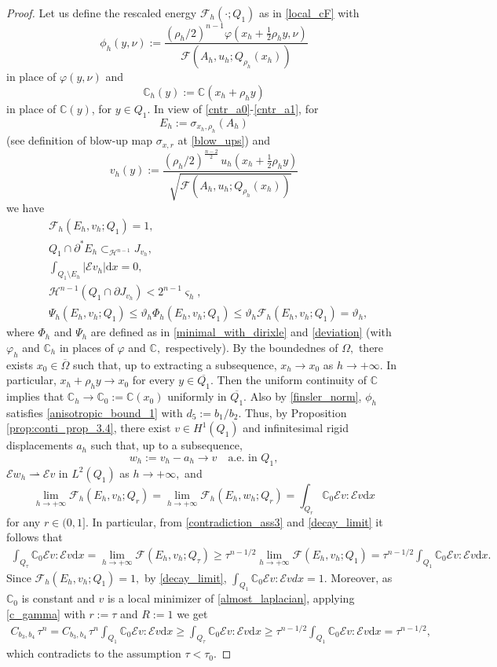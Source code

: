 \documentclass[reqno]{amsart}
\numberwithin{equation}{section}
\theoremstyle{plain}
\theoremstyle{definition}
\newcommand{\C}{\mathbb{C}}
\newcommand{\cH}{\mathcal{H}}
\newcommand{\cF}{\mathcal{F}}
\newcommand{\p}{\partial}
\newcommand{\wk}{\rightharpoonup}
\newcommand{\cl}[1]{\overline{#1}}
\newcommand{\bound}{b}
\renewcommand{\d}{\mathrm{d}}
\newcommand{\str}[1]{\mathcal{E}#1}
\begin{document}
\begin{proof}
Let us define the rescaled energy $\cF_h(\cdot;Q_1)$ as in \eqref{local_cF} with
$$
\phi_h(y,\nu):= \frac{(\rho_h/2)^{n-1}\varphi(x_h+\frac12\rho_hy,\nu)}{ \cF(A_h,u_h;Q_{\rho_h}(x_h))}
$$
in place of $\varphi(y,\nu)$ and 
$$
 \C_h(y):=\C(x_h+\rho_hy)
$$
in place of  $\C(y)$, for $y\in Q_1$. In view of \eqref{cntr_a0}-\eqref{cntr_a1},   for
$$
E_h:= \sigma_{x_h,\rho_h}(A_h)
$$
(see definition of blow-up map $\sigma_{x,r}$ at \eqref{blow_ups}) and
$$
v_h(y):=\frac{(\rho_h/2)^{\frac{n-2}{2}}\,  u_h(x_h+\frac12\rho_hy)}{\sqrt{\cF(A_h,u_h;Q_{\rho_h}(x_h))}} 
$$
we have 
\begin{align*}
& \cF_h(E_h,v_h;Q_1)=1,\\
& Q_1\cap \p^*E_h \subset_{\cH^{n-1}} J_{v_h},\\
& \int_{Q_1\setminus E_h}|\str{v_h}|\d x=0,\\
& \cH^{n-1} (Q_1\cap \p J_{v_h}) < 2^{n-1} \varsigma_h,\\
& \Psi_h(E_h,v_h;Q_1) \le \vartheta_h \Phi_h(E_h,v_h;Q_1) \le \vartheta_h \cF_h(E_h,v_h;Q_1)=\vartheta_h,
\end{align*}
where $\Phi_h$ and $\Psi_h$ are defined as in \eqref{minimal_with_dirixle} and \eqref{deviation} (with $\varphi_h$ and $\C_h$ in places of $\varphi$ and $\C, $ respectively). By the boundednes of $\Omega,$ there exists $x_0\in \cl{\Omega}$ such that, up to extracting a subsequence, $x_h\to x_0$ as $h\to+\infty.$ In particular, $x_h+ \rho_h y\to x_0$ for every $y\in \cl{Q_1}.$ Then the uniform continuity of $\C$ implies that $\C_h\to \C_0:=\C(x_0)$ uniformly in $ \cl{Q_1}.$ 
%
Also by \eqref{finsler_norm}, $\phi_h$ satisfies \eqref{anisotropic_bound_1} with $d_5:=\bound_1/\bound_2.$ Thus,  by Proposition \ref{prop:conti_prop_3.4}, there exist $v\in H^1(Q_1 )$ and infinitesimal rigid displacements $a_h$ such that, up to a subsequence,
$$
w_h:=v_h - a_h \to v\quad\text{a.e. in $Q_1,$}
$$ 
$\str{w_h} \wk \str{v}$ in $L^2(Q_1)$ as $h\to+\infty,$
and  
\begin{equation}\label{decay_limit}
\lim\limits_{h\to+\infty} \cF_h(E_h,v_h;Q_r) =\lim\limits_{h\to+\infty} \cF_h(E_h,w_h;Q_r) = \int_{Q_r} \C_0 \str{v}:\str{v}\d x
\end{equation}
for any $r\in(0,1].$
%
In particular, 
from \eqref{contradiction_ass3} and \eqref{decay_limit} it follows that
\begin{align*}
\int_{Q_\tau} \C_0 \str{v}:\str{v}\d x =\lim\limits_{h\to+\infty}\cF(E_h,v_h;Q_{\tau})
\geq  \tau^{n-1/2} \lim\limits_{h\to+\infty}  \cF(E_h,v_h;Q_{1})
= \tau^{n-1/2} \int_{Q_1} \C_0 \str{v}:\str{v}\d x.
\end{align*}
%
Since $ \cF_h(E_h,v_h;Q_1)=1,$ by \eqref{decay_limit},  $\int_{Q_1} \C_0\str{v}:\str{v}dx =1.$ Moreover, as $\C_0$ is constant and $v$ is a local minimizer of \eqref{almost_laplacian},  applying \eqref{c_gamma} with $r:=\tau$ and $R:=1$ we get
\begin{align*}
C_{\bound_3,\bound_4}\,\tau^n =   C_{\bound_3,\bound_4}\,\tau^n\int_{Q_1} \C_0 \str{v}:\str{v}\d x \ge \int_{Q_{\tau}}  \C_0 \str{v}:\str{v}\d x
\ge   \tau^{n-1/2}  \int_{Q_1} \C_0 \str{v}:\str{v}\d x = \tau^{n-1/2},
\end{align*}
%
which contradicts to the assumption $\tau<\tau_0.$
\end{proof}
\end{document}
